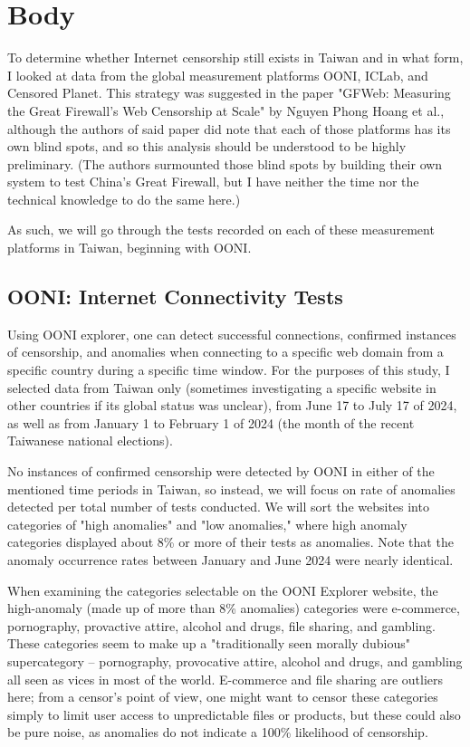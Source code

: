 \section{Body}\label{sec:body}

To determine whether Internet censorship still exists in Taiwan and in what form, I looked at data from the global measurement platforms OONI, ICLab,
and Censored Planet. This strategy was suggested in the paper "GFWeb: Measuring the Great Firewall's Web Censorship at Scale" by Nguyen Phong Hoang et al.,
although the authors of said paper did note that each of those platforms has its own blind spots, and so this analysis should be understood to be highly
preliminary. (The authors surmounted those blind spots by building their own system to test China's Great Firewall, but I have neither the time nor the
technical knowledge to do the same here.)

As such, we will go through the tests recorded on each of these measurement platforms in Taiwan, beginning with OONI.

\subsection{OONI: Internet Connectivity Tests}
Using OONI explorer, one can detect successful connections, confirmed instances of censorship, and anomalies when connecting to a specific web domain
from a specific country during a specific time window. For the purposes of this study, I selected data from Taiwan only (sometimes investigating a specific
website in other countries if its global status was unclear), from June 17 to July 17 of 2024, as well as from January 1 to February 1 of 2024 (the month of
the recent Taiwanese national elections). 

No instances of confirmed censorship were detected by OONI in either of the mentioned time periods in Taiwan, so instead, we will focus on rate of anomalies
detected per total number of tests conducted. We will sort the websites into categories of "high anomalies" and "low anomalies," where high anomaly categories 
displayed about 8\% or more of their tests as anomalies. Note that the anomaly occurrence rates between January and June 2024 were nearly identical.

When examining the categories selectable on the OONI Explorer website, the high-anomaly (made up of more than 8\% anomalies) categories were e-commerce,
pornography, provactive attire, alcohol and drugs, file sharing, and gambling. These categories seem to make up a "traditionally seen morally dubious"
supercategory -- pornography, provocative attire, alcohol and drugs, and gambling all seen as vices in most of the world. E-commerce and file sharing are
outliers here; from a censor's point of view, one might want to censor these categories simply to limit user access to unpredictable files or products,
but these could also be pure noise, as anomalies do not indicate a 100\% likelihood of censorship.

